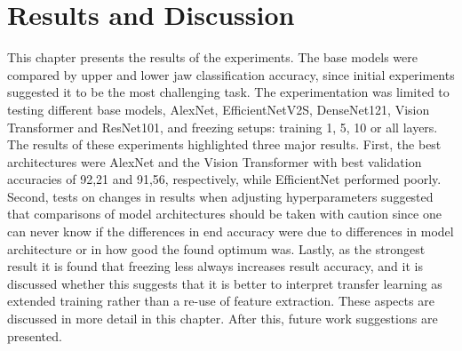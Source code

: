 \documentclass[english,twoside,openright]{UH_DS_MSc}
\begin{document}
\chapter{Results and Discussion}

This chapter presents the results of the experiments. The base models were compared by
upper and lower jaw classification accuracy, since initial experiments suggested it to be the most challenging task. The experimentation was limited to testing different base models, AlexNet, EfficientNetV2S, 
DenseNet121, Vision Transformer and ResNet101, and freezing setups: training 1, 5, 10 or all layers.
The results of these experiments highlighted three major results. First, the best architectures were AlexNet and the Vision 
Transformer with best validation accuracies of 92,21 and 91,56, respectively, while EfficientNet performed poorly. Second, tests on changes in results 
when adjusting hyperparameters suggested that comparisons of model architectures should be taken with caution since one can never know 
if the differences in end accuracy were due to differences in model architecture or in how good the found optimum was. Lastly, as the strongest result it is found that freezing less 
always increases result accuracy, and it is discussed whether this suggests that it is better to interpret transfer learning as extended 
training rather than a re-use of feature extraction. These aspects are discussed in more detail in this chapter. After this, future work suggestions are presented.
\end{document}
